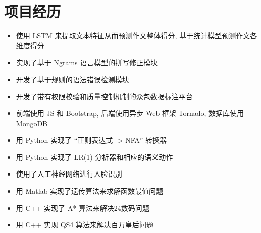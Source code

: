 \section{项目经历}

\begin{itemize}
  \item 使用 LSTM 来提取文本特征从而预测作文整体得分, 基于统计模型预测作文各维度得分
  \item 实现了基于 Ngrams 语言模型的拼写修正模块
  \item 开发了基于规则的语法错误检测模块
\end{itemize}

\begin{itemize}
  \item 开发了带有权限校验和质量控制机制的众包数据标注平台
  \item 前端使用 JS 和 Bootstrap, 后端使用异步 Web 框架 Tornado, 数据库使用 MongoDB
\end{itemize}

\begin{itemize}
  \item 用 Python 实现了 ``正则表达式 -> NFA'' 转换器
  \item 用 Python 实现了 LR(1) 分析器和相应的语义动作
\end{itemize}

\begin{itemize}
  \item 使用了人工神经网络进行人脸识别
  \item 用 Matlab 实现了遗传算法来求解函数最值问题
  \item 用 C++ 实现了 A* 算法来解决24数码问题
  \item 用 C++ 实现 QS4 算法来解决百万皇后问题
\end{itemize}

